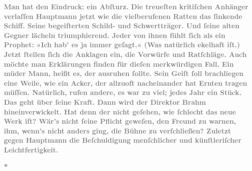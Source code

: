 \pstart
           \textcolor{gray}{\textbf{Man hat den Eindruck: ein Abſturz. Die treueſten kritiſchen
                  Anhänger verlaſſen Hauptmann jetzt wie die
                  vielberufenen Ratten das ſinkende Schiff. Seine begeiſterten Schild- und
                  Schwertträger. Und ſeine alten Gegner lächeln triumphierend. Jeder von ihnen fühlt
                  ſich als ein Prophet: »Ich hab’ es ja immer geſagt.« (Was natürlich ekelhaft iſt.)
                  Jetzt ſtellen ſich die Anklagen ein, die Vorwürfe und Ratſchläge. Auch möchte man
                  Erklärungen finden für dieſen merkwürdigen Fall. Ein müder Mann, heißt es, der
                  ausruhen ſollte. Sein Geiſt ſoll brachliegen eine Weile, wie ein Acker, der
                  allzuoft nacheinander hat Ernten tragen müſſen. Natürlich, rufen andere, es war zu
                  viel; jedes Jahr ein Stück. Das geht über ſeine Kraft. Dann wird der Direktor Brahm hineinverwickelt. Hat denn der nicht
                  geſehen, wie ſchlecht das neue Werk iſt? Wär’s nicht ſeine Pflicht geweſen, den Freund zu warnen, ihm, wenn’s nicht
                  anders ging, die Bühne zu
                  verſchließen? Zuletzt gegen Hauptmann die
                  Beſchuldigung menſchlicher und künſtleriſcher Leichtfertigkeit.}}\pend
           
\pstart
           \centering{}\textcolor{gray}{\textbf{*}}\pend
           
